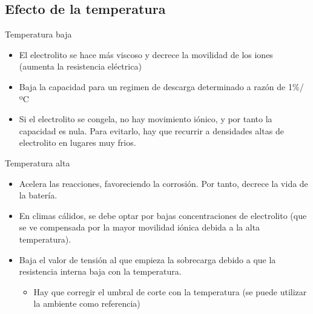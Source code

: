 \documentclass[xcolor={usenames,svgnames,dvipsnames}]{beamer}
\begin{document}
\subsection{Efecto de la temperatura}
\label{sec-2-3}

\begin{frame}[label=sec-2-3-1]{Temperatura baja}
\begin{itemize}
\item El electrolito se hace más viscoso y decrece la movilidad de los iones (aumenta la resistencia eléctrica)

\item \alert{Baja la capacidad} para un regimen de descarga determinado a razón de 1\%/ºC

\item Si el electrolito se congela, no hay movimiento iónico, y por tanto la capacidad es nula. Para evitarlo, \alert{hay que recurrir a densidades altas de electrolito en lugares muy frios}.
\end{itemize}
\end{frame}

\begin{frame}[label=sec-2-3-2]{Temperatura alta}
\begin{itemize}
\item \alert{Acelera las reacciones, favoreciendo la corrosión}. Por tanto, decrece la vida de la batería.

\item En \alert{climas cálidos}, se debe optar por \alert{bajas concentraciones de electrolito} (que se ve compensada por la mayor movilidad iónica debida a la alta temperatura).

\item \alert{Baja el valor de tensión al que empieza la sobrecarga} debido a que la resistencia interna baja con la temperatura.

\begin{itemize}
\item Hay que corregir el umbral de corte con la temperatura (se puede utilizar la ambiente como referencia)
\end{itemize}
\end{itemize}
\end{frame}
\end{document}
